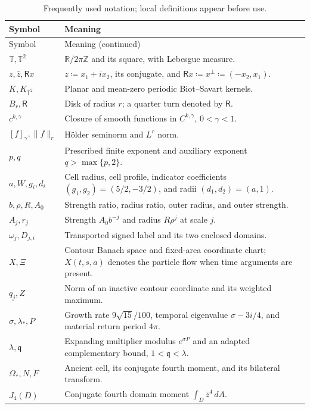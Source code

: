 \documentclass[11pt]{amsart}
\theoremstyle{remark}
\numberwithin{equation}{section}
\newcommand{\R}{\mathbb R}
\newcommand{\T}{\mathbb T}
\begin{document}
\begingroup\small
\setlength{\tabcolsep}{5pt}
\begin{longtable}{@{}p{}p{}@{}}
\caption{Frequently used notation; local definitions appear before use.}
\label{tab:notation}\\
\toprule Symbol & Meaning \\ \midrule
\endfirsthead
\toprule Symbol & Meaning (continued) \\ \midrule
\endhead
\bottomrule\endfoot
$\T,\T^2$ & $\R/2\pi\mathbb Z$ and its square, with Lebesgue measure.\\
$z,\bar z,\mathsf Rx$ & $z\coloneqq x_1+ix_2$, its conjugate, and
$\mathsf Rx\coloneqq x^\perp\coloneqq(-x_2,x_1)$.\\
$K,K_{\T^2}$ & Planar and mean-zero periodic Biot--Savart kernels.\\
$B_r,\mathsf R$ & Disk of radius $r$; a quarter turn denoted by $\mathsf R$.\\
$c^{k,\gamma}$ & Closure of smooth functions in $C^{k,\gamma}$,
$0<\gamma<1$.\\
$[f]_\gamma,\|f\|_r$ & H\"older seminorm and $L^r$ norm.\\
$p,q$ & Prescribed finite exponent and auxiliary exponent
$q>\max\{p,2\}$.\\
$a,W,g_i,d_i$ & Cell radius, cell profile, indicator coefficients
$(g_1,g_2)=(5/2,-3/2)$, and radii $(d_1,d_2)=(a,1)$.\\
$b,\rho,R,A_0$ & Strength ratio, radius ratio, outer radius, and outer strength.\\
$A_j,r_j$ & Strength $A_0b^{-j}$ and radius $R\rho^j$ at scale $j$.\\
$\omega_j,D_{j,i}$ & Transported signed label and its two enclosed domains.\\
$X,\Xi$ & Contour Banach space and fixed-area coordinate chart;
$X(t,s,a)$ denotes the particle flow when time arguments are present.\\
$q_j,Z$ & Norm of an inactive contour coordinate and its weighted maximum.\\
$\sigma,\lambda_*,P$ & Growth rate $9\sqrt{15}/100$, temporal eigenvalue
$\sigma-3i/4$, and material return period $4\pi$.\\
$\lambda,\mathfrak q$ & Expanding multiplier modulus $e^{\sigma P}$
and an adapted complementary bound, $1<\mathfrak q<\lambda$.\\
$\Omega_*,N,F$ & Ancient cell, its conjugate fourth moment, and its
bilateral transform.\\
$J_4(D)$ & Conjugate fourth domain moment $\int_D\bar z^4\,dA$.\\

\end{longtable}
\end{document}
